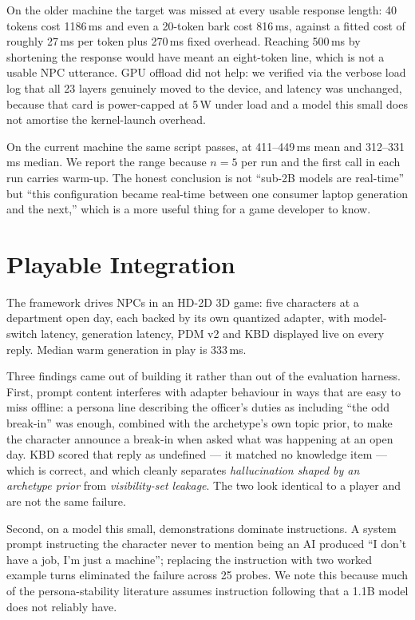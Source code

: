 \documentclass[conference]{IEEEtran}
\begin{document}
On the older machine the target was missed at every usable response length: 40
tokens cost 1186\,ms and even a 20-token bark cost 816\,ms, against a fitted
cost of roughly 27\,ms per token plus 270\,ms fixed overhead. Reaching 500\,ms by
shortening the response would have meant an eight-token line, which is not a
usable NPC utterance. GPU offload did not help: we verified via the verbose load
log that all 23 layers genuinely moved to the device, and latency was unchanged,
because that card is power-capped at 5\,W under load and a model this small does
not amortise the kernel-launch overhead.

On the current machine the same script passes, at 411--449\,ms mean and
312--331\,ms median. We report the range because $n=5$ per run and the first
call in each run carries warm-up. The honest conclusion is not ``sub-2B models
are real-time'' but ``this configuration became real-time between one consumer
laptop generation and the next,'' which is a more useful thing for a game
developer to know.

\section{Playable Integration} \label{sec:playable}

The framework drives NPCs in an HD-2D 3D game: five characters at a department
open day, each backed by its own quantized adapter, with model-switch latency,
generation latency, PDM v2 and KBD displayed live on every reply. Median warm
generation in play is 333\,ms.

Three findings came out of building it rather than out of the evaluation harness.
First, prompt content interferes with adapter behaviour in ways that are easy to
miss offline: a persona line describing the officer's duties as including
``the odd break-in'' was enough, combined with the archetype's own topic prior,
to make the character announce a break-in when asked what was happening at an
open day. KBD scored that reply as undefined --- it matched no knowledge item ---
which is correct, and which cleanly separates \emph{hallucination shaped by an
archetype prior} from \emph{visibility-set leakage}. The two look identical to a
player and are not the same failure.

Second, on a model this small, demonstrations dominate instructions. A system
prompt instructing the character never to mention being an AI produced ``I don't
have a job, I'm just a machine''; replacing the instruction with two worked
example turns eliminated the failure across 25 probes. We note this because much
of the persona-stability literature assumes instruction following that a 1.1B
model does not reliably have.
\end{document}
